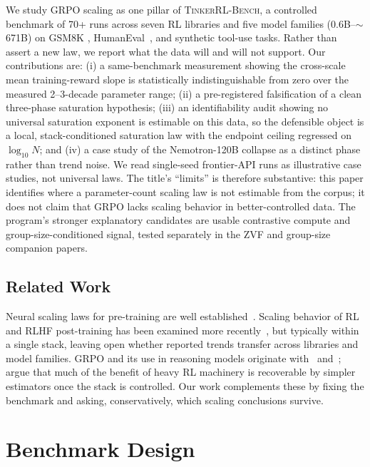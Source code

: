 \documentclass{article}
\newcommand{\ours}{\textsc{TinkerRL-Bench}}
\begin{document}
We study GRPO scaling as one pillar of \ours{}, a controlled benchmark of 70+ runs
across seven RL libraries and five model families ($0.6$B--$\sim$671B) on GSM8K
\citep{cobbe2021training}, HumanEval~\citep{chen2021codex}, and synthetic tool-use
tasks. Rather than assert a new law, we report what the data will and will not
support. Our contributions are: (i) a same-benchmark measurement showing the
cross-scale mean training-reward slope is statistically indistinguishable from zero
over the measured 2--3-decade parameter range; (ii) a pre-registered falsification of a clean
three-phase saturation hypothesis; (iii) an identifiability audit showing no
universal saturation exponent is estimable on this data, so the defensible object
is a local, stack-conditioned saturation law with the endpoint ceiling regressed
on $\log_{10} N$; and (iv) a case study of the Nemotron-120B collapse as a
distinct phase rather than trend noise. We read single-seed frontier-API runs as
illustrative case studies, not universal laws. The title's ``limits'' is therefore
substantive: this paper identifies where a parameter-count scaling law is not
estimable from the corpus; it does not claim that GRPO lacks scaling behavior in
better-controlled data. The program's stronger explanatory candidates are usable
contrastive compute and group-size-conditioned signal, tested separately in the
ZVF and group-size companion papers.

\subsection{Related Work}
\label{sec:p1-related}
Neural scaling laws for pre-training are well established~\citep{kaplan2020scalinglaws, hoffmann2022chinchilla, muennighoff2023datascaling}. Scaling behavior of RL and
RLHF post-training has been examined more recently~\citep{hilton2023rlscaling, rafailov2024rlhfscaling, nimmaturi2025predictive}, but typically within a single
stack, leaving open whether reported trends transfer across libraries and model
families. GRPO and its use in reasoning models originate
with~\citet{shao2024deepseekmath} and~\citet{guo2025deepseekr1};
\citet{ahmadian2024backtobasics} argue that much of the benefit of heavy RL
machinery is recoverable by simpler estimators once the stack is controlled. Our
work complements these by fixing the benchmark and asking, conservatively, which
scaling conclusions survive.
 \section{Benchmark Design}
\label{sec:benchmark}
\end{document}
